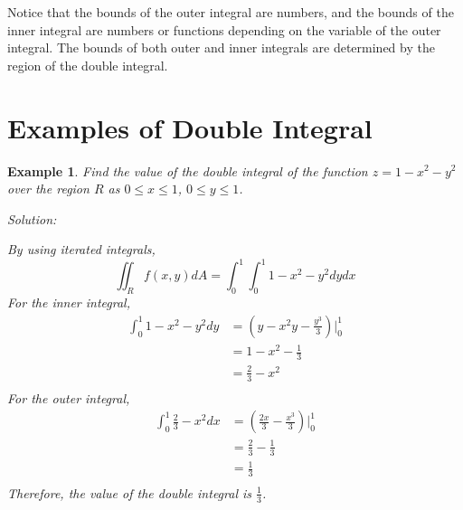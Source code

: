 \documentclass{article}
\newtheorem{example}{Example}
\begin{document}
Notice that the bounds of the outer integral are numbers, and the bounds of the 
inner integral are numbers or functions depending on the variable of the outer 
integral. The bounds of both outer and inner integrals are determined by the 
region of the double integral.

\section{Examples of Double Integral}

\begin{example}
  Find the value of the double integral of the function $z = 1 - x^2 - y^2$ over 
  the region $R$ as $0 \leq x \leq 1$, $0 \leq y \leq 1$.

  Solution:

  By using iterated integrals,
  \begin{equation*}
    \iint_R f(x, y) dA = \int_0^1 \int_0^1 1 - x^2 - y^2 dy dx
  \end{equation*}
  For the inner integral,
  \begin{equation*}
    \begin{split}
      \int_0^1 1 - x^2 - y^2 dy &= (y - x^2y - \frac{y^3}{3})|_0^1 \\
                                &= 1 - x^2 - \frac{1}{3} \\
                                &= \frac{2}{3} - x^2 \\
    \end{split}
  \end{equation*}
  For the outer integral,
  \begin{equation*}
    \begin{split}
      \int_0^1 \frac{2}{3} - x^2 dx &= (\frac{2x}{3} - \frac{x^3}{3})|_0^1 \\
                                    &= \frac{2}{3} - \frac{1}{3} \\
                                    &= \frac{1}{3} \\
    \end{split}
  \end{equation*}
  Therefore, the value of the double integral is $\frac{1}{3}$.
\end{example}
\end{document}
